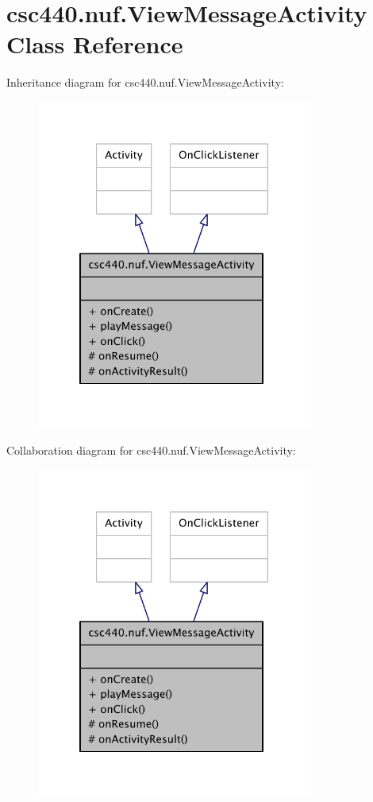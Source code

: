 \hypertarget{classcsc440_1_1nuf_1_1_view_message_activity}{\section{csc440.\-nuf.\-View\-Message\-Activity Class Reference}
\label{classcsc440_1_1nuf_1_1_view_message_activity}
}


Inheritance diagram for csc440.\-nuf.\-View\-Message\-Activity\-:
\nopagebreak
\begin{figure}[H]
\begin{center}
\leavevmode
\includegraphics[width=257pt]{classcsc440_1_1nuf_1_1_view_message_activity__inherit__graph}
\end{center}
\end{figure}


Collaboration diagram for csc440.\-nuf.\-View\-Message\-Activity\-:
\nopagebreak
\begin{figure}[H]
\begin{center}
\leavevmode
\includegraphics[width=257pt]{classcsc440_1_1nuf_1_1_view_message_activity__coll__graph}
\end{center}
\end{figure}
